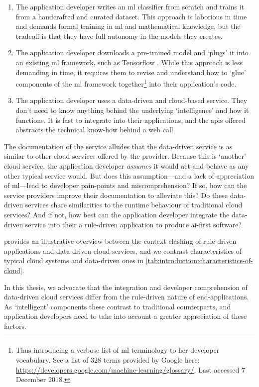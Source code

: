 \begin{enumerate}
  \item The application developer writes an \gls{ml} classifier from scratch and trains it from a handcrafted and curated dataset. This approach is laborious in time and demands formal training in \gls{ml} and mathematical knowledge, but the tradeoff is that they have full autonomy in the models they creates.
  \item The application developer downloads a pre-trained model and `plugs' it into an existing \gls{ml} framework, such as Tensorflow \citep{Abadi:2016vn}. While this approach is less demanding in time, it requires them to revise and understand how to `glue' components of the \gls{ml} framework together\footnote{Thus introducing a verbose list of \gls{ml} terminology to her developer vocabulary. See a list of 328 terms provided by Google here: \url{https://developers.google.com/machine-learning/glossary/}. Last accessed 7 December 2018.} into their application's code.
  \item The application developer uses a data-driven and cloud-based service. They don't need to know anything behind the underlying `intelligence' and how it functions. It is fast to integrate into their applications, and the \glspl{api} offered abstracts the technical know-how behind a web call.
\end{enumerate}

\noindent
The documentation of the service alludes that the data-driven service is as similar to other cloud services offered by the provider. 
Because this is `another' cloud service, the application developer \textit{assumes} it would act and behave as any other typical service would.
But does this assumption---and a lack of appreciation of \gls{ml}---lead to developer pain-points and miscomprehension?
If so, how can the service providers improve their documentation to alleviate this?
Do these data-driven services share similarities to the runtime behaviour of traditional cloud services?
And if not, how best can the application developer integrate the data-driven service into their a rule-driven application to produce \gls{ai}-first software?

 provides an illustrative overview between the context clashing of rule-driven applications and data-driven cloud services, and we contrast characteristics of typical cloud systems and data-driven ones in \cref{tab:introduction:characteristics-of-cloud}.

\begin{callout}
In this thesis, we advocate that the integration and developer comprehension of data-driven cloud services differ from the rule-driven nature of end-applications. As `intelligent' components these contrast to traditional counterparts, and application developers need to take into account a greater appreciation of these factors.
\end{callout}

